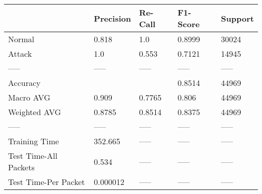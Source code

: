 \begin{tabular}{lllll}
\toprule
{} & Precision & Re-Call & F1-Score & Support \\
\midrule
Normal                &     0.818 &     1.0 &   0.8999 &   30024 \\
Attack                &       1.0 &   0.553 &   0.7121 &   14945 \\
-----                 &     ----- &   ----- &    ----- &   ----- \\
Accuracy              &           &         &   0.8514 &   44969 \\
Macro AVG             &     0.909 &  0.7765 &    0.806 &   44969 \\
Weighted AVG          &    0.8785 &  0.8514 &   0.8375 &   44969 \\
-----                 &     ----- &   ----- &    ----- &   ----- \\
Training Time         &   352.665 &   ----- &    ----- &   ----- \\
Test Time-All Packets &     0.534 &   ----- &    ----- &   ----- \\
Test Time-Per Packet  &  0.000012 &   ----- &    ----- &   ----- \\
\bottomrule
\end{tabular}
